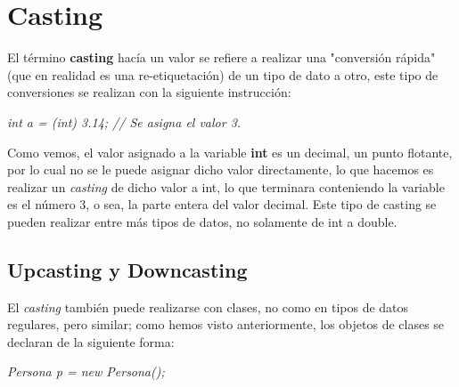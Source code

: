 \section{Casting}
\hspace{0.55cm}El término \textbf{casting} hacía un valor se refiere a realizar una "conversión rápida" (que en realidad es una re-etiquetación) de un tipo de dato a otro, este tipo de conversiones se realizan con la siguiente instrucción:
\begin{center}
    \textit{int a = (int) 3.14; // Se asigna el valor 3.}
\end{center}

Como vemos, el valor asignado a la variable \textbf{int} es un decimal, un punto flotante, por lo cual no se le puede asignar dicho valor directamente, lo que hacemos es realizar un \textit{casting} de dicho valor a int, lo que terminara conteniendo la variable es el número 3, o sea, la parte entera del valor decimal. Este tipo de casting se pueden realizar entre más tipos de datos, no solamente de int a double.


\subsection{Upcasting y Downcasting}
\hspace{0.55cm}El \textit{casting} también puede realizarse con clases, no como en tipos de datos regulares, pero similar; como hemos visto anteriormente, los objetos de clases se declaran de la siguiente forma:
\begin{center}
    \textit{Persona p = new Persona();}
\end{center}

